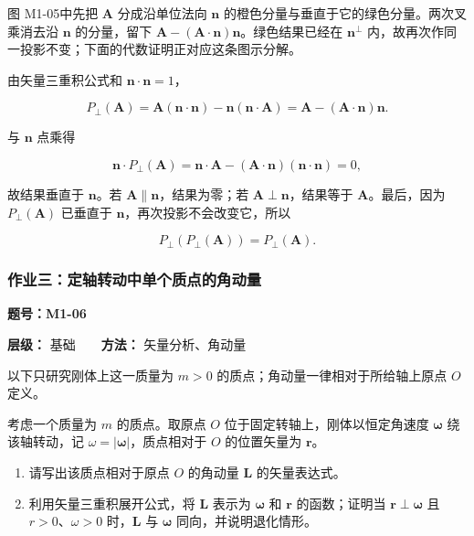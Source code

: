 图 M1-05中先把 \(\mathbf A\) 分成沿单位法向 \(\mathbf n\)
的橙色分量与垂直于它的绿色分量。两次叉乘消去沿 \(\mathbf n\)
的分量，留下
\(\mathbf A-(\mathbf A\cdot\mathbf n)\mathbf n\)。绿色结果已经在
\(\mathbf n^{\perp}\)
内，故再次作同一投影不变；下面的代数证明正对应这条图示分解。

由矢量三重积公式和 \(\mathbf n\cdot\mathbf n=1\)，

\[
P_{\perp}(\mathbf A)
=\mathbf A(\mathbf n\cdot\mathbf n)
-\mathbf n(\mathbf n\cdot\mathbf A)
=\mathbf A-(\mathbf A\cdot\mathbf n)\mathbf n.
\]

与 \(\mathbf n\) 点乘得

\[
\mathbf n\cdot P_{\perp}(\mathbf A)
=\mathbf n\cdot\mathbf A
-(\mathbf A\cdot\mathbf n)(\mathbf n\cdot\mathbf n)=0,
\]

故结果垂直于 \(\mathbf n\)。若
\(\mathbf A\parallel\mathbf n\)，结果为零；若
\(\mathbf A\perp\mathbf n\)，结果等于 \(\mathbf A\)。最后，因为
\(P_{\perp}(\mathbf A)\) 已垂直于
\(\mathbf n\)，再次投影不会改变它，所以

\[
P_{\perp}(P_{\perp}(\mathbf A))=P_{\perp}(\mathbf A).
\]

\par{}
\noindent\begin{minipage}{\linewidth}

\subsubsection{作业三：定轴转动中单个质点的角动量}\label{m1:ux4f5cux4e1aux4e09ux5b9aux8f74ux8f6cux52a8ux4e2dux5355ux4e2aux8d28ux70b9ux7684ux89d2ux52a8ux91cf}

\textbf{题号：M1-06}

\textbf{层级：} 基础　　\textbf{方法：} 矢量分析、角动量

以下只研究刚体上这一质量为 \(m>0\) 的质点；角动量一律相对于所给轴上原点
\(O\) 定义。

考虑一个质量为 \(m\) 的质点。取原点 \(O\)
位于固定转轴上，刚体以恒定角速度 \(\boldsymbol{\omega}\) 绕该轴转动，记
\(\omega=|\boldsymbol\omega|\)，质点相对于 \(O\) 的位置矢量为
\(\mathbf{r}\)。

\begin{enumerate}
\def\labelenumi{(\arabic{enumi})}
\item
  请写出该质点相对于原点 \(O\) 的角动量 \(\mathbf{L}\) 的矢量表达式。
\item
  利用矢量三重积展开公式，将 \(\mathbf{L}\) 表示为
  \(\boldsymbol{\omega}\) 和 \(\mathbf{r}\) 的函数；证明当
  \(\mathbf r\perp\boldsymbol\omega\) 且 \(r>0\)、\(\omega>0\)
  时，\(\mathbf L\) 与 \(\boldsymbol\omega\) 同向，并说明退化情形。
\end{enumerate}


\end{minipage}\par

